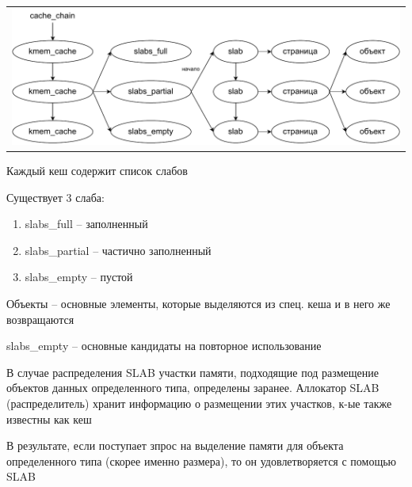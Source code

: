 \begin{table}[h!]
	\centering
	\begin{tabular}{p{1\linewidth}}
		\centering
		\includegraphics[width=0.8\linewidth]{./images/slabs.pdf}
	\end{tabular}
\end{table}

Каждый кеш содержит список слабов

Существует 3 слаба:
\begin{enumerate}
	\item slabs\_full -- заполненный
	\item slabs\_partial -- частично заполненный
	\item slabs\_empty -- пустой
\end{enumerate}

Объекты -- основные элементы, которые выделяются из спец. кеша и в него же возвращаются

slabs\_empty -- основные кандидаты на повторное использование

В случае распределения SLAB участки памяти, подходящие под размещение объектов данных определенного типа, определены заранее. Аллокатор SLAB (распределитель) хранит информацию о размещении этих участков, к-ые также известны как кеш

В результате, если поступает зпрос на выделение памяти для объекта определенного типа (скорее именно размера), то он удовлетворяется с помощью SLAB

